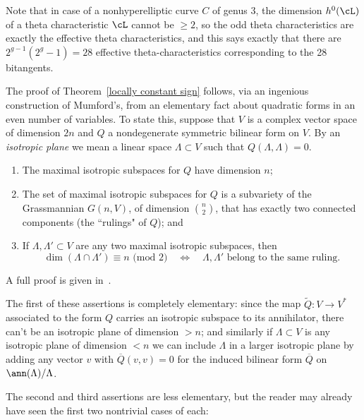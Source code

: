 Note that in case of a nonhyperelliptic curve $C$ of genus 3, the dimension $h^0(\cL)$ of a theta characteristic $\cL$ cannot be $\geq 2$, so
the odd theta characteristics are exactly the effective theta characteristics, and  this says exactly that there are $2^{g-1}(2^g-1) = 28$ effective theta-characteristics corresponding to the 28 bitangents.

The proof of Theorem~\ref{locally constant sign} follows, via an ingenious construction of Mumford's, from an elementary fact about quadratic forms in an even number of variables.
To state this, suppose that $V$ is a complex vector space of dimension $2n$ and $Q$ a nondegenerate symmetric bilinear form on $V$. By an \emph{isotropic plane} we mean a linear space $\Lambda \subset V$ such that $Q(\Lambda, \Lambda) = 0$. 

\begin{fact}
 \begin{enumerate}
\item The maximal isotropic subspaces for $Q$ have dimension $n$;
\item The set of maximal isotropic subspaces for $Q$ is a subvariety of the Grassmannian $G(n,V)$, of dimension $\binom{n}{2}$, that has exactly two connected components (the ``rulings" of $Q$); and
\item If $\Lambda, \Lambda' \subset V$ are any two maximal isotropic subspaces, then
$$
\dim(\Lambda \cap \Lambda') \equiv n \text{ (mod 2)} \quad \iff \quad \Lambda, \Lambda' \text{ belong to the same ruling.}
$$
\end{enumerate} 
A full proof is given in~\cite[pp. 735--740]{Griffiths-Harris1978}.
\end{fact}

The first of these assertions is completely elementary: since the map $\tilde Q : V \to V^*$ associated to the form $Q$ carries an isotropic subspace to its annihilator, there can't be an isotropic plane of dimension $>n$; and similarly if $\Lambda \subset V$ is any isotropic plane of dimension $<n$ we can include $\Lambda$ in a larger isotropic plane by adding any vector $v$ with $\overline Q(v,v) = 0$ for the induced bilinear form $\overline Q$ on $\ann(\Lambda)/\Lambda$.

The second and third assertions are less elementary, but the reader may already have seen the first two nontrivial cases of each: 

